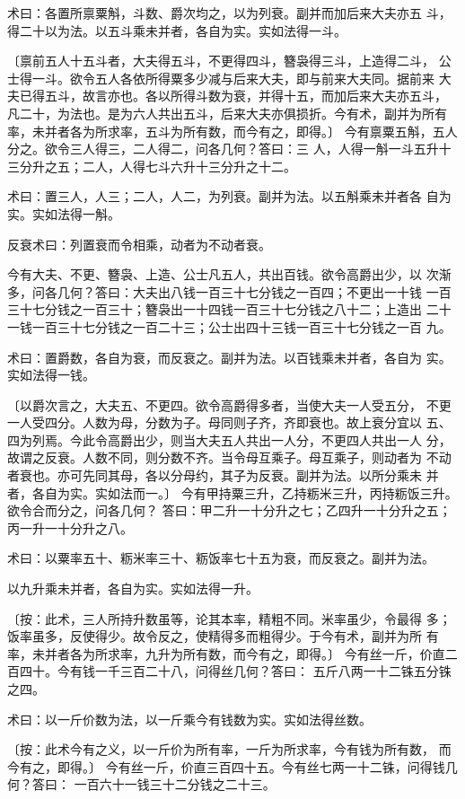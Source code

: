 \documentclass[12pt,UTF8]{ctexbook}
\begin{document}
术曰：各置所禀粟斛，斗数、爵次均之，以为列衰。副并而加后来大夫亦五 斗，得二十以为法。以五斗乘未并者，各自为实。实如法得一斗。

〔禀前五人十五斗者，大夫得五斗，不更得四斗，簪袅得三斗，上造得二斗， 公士得一斗。欲令五人各依所得粟多少减与后来大夫，即与前来大夫同。据前来 大夫已得五斗，故言亦也。各以所得斗数为衰，并得十五，而加后来大夫亦五斗， 凡二十，为法也。是为六人共出五斗，后来大夫亦俱损折。今有术，副并为所有 率，未并者各为所求率，五斗为所有数，而今有之，即得。〕 今有禀粟五斛，五人分之。欲令三人得三，二人得二，问各几何？答曰：三 人，人得一斛一斗五升十三分升之五；二人，人得七斗六升十三分升之十二。

术曰：置三人，人三；二人，人二，为列衰。副并为法。以五斛乘未并者各 自为实。实如法得一斛。

反衰术曰：列置衰而令相乘，动者为不动者衰。

今有大夫、不更、簪袅、上造、公士凡五人，共出百钱。欲令高爵出少，以 次渐多，问各几何？答曰：大夫出八钱一百三十七分钱之一百四；不更出一十钱 一百三十七分钱之一百三十；簪袅出一十四钱一百三十七分钱之八十二；上造出 二十一钱一百三十七分钱之一百二十三；公士出四十三钱一百三十七分钱之一百 九。

术曰：置爵数，各自为衰，而反衰之。副并为法。以百钱乘未并者，各自为 实。实如法得一钱。

〔以爵次言之，大夫五、不更四。欲令高爵得多者，当使大夫一人受五分， 不更一人受四分。人数为母，分数为子。母同则子齐，齐即衰也。故上衰分宜以 五、四为列焉。今此令高爵出少，则当大夫五人共出一人分，不更四人共出一人 分，故谓之反衰。人数不同，则分数不齐。当令母互乘子。母互乘子，则动者为 不动者衰也。亦可先同其母，各以分母约，其子为反衰。副并为法。以所分乘未 并者，各自为实。实如法而一。〕 今有甲持粟三升，乙持粝米三升，丙持粝饭三升。欲令合而分之，问各几何？ 答曰：甲二升一十分升之七；乙四升一十分升之五；丙一升一十分升之八。

术曰：以粟率五十、粝米率三十、粝饭率七十五为衰，而反衰之。副并为法。

以九升乘未并者，各自为实。实如法得一升。

〔按：此术，三人所持升数虽等，论其本率，精粗不同。米率虽少，令最得 多；饭率虽多，反使得少。故令反之，使精得多而粗得少。于今有术，副并为所 有率，未并者各为所求率，九升为所有数，而今有之，即得。〕 今有丝一斤，价直二百四十。今有钱一千三百二十八，问得丝几何？答曰： 五斤八两一十二铢五分铢之四。

术曰：以一斤价数为法，以一斤乘今有钱数为实。实如法得丝数。

〔按：此术今有之义，以一斤价为所有率，一斤为所求率，今有钱为所有数， 而今有之，即得。〕 今有丝一斤，价直三百四十五。今有丝七两一十二铢，问得钱几何？答曰： 一百六十一钱三十二分钱之二十三。
\end{document}
